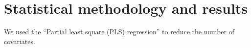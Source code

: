 \section*{Statistical methodology and results} \label{Sec_Methods}
We used the ``Partial least square (PLS) regression'' \cite{Mevik_Wehrens_2007_JSS} to reduce the number of covariates. 

